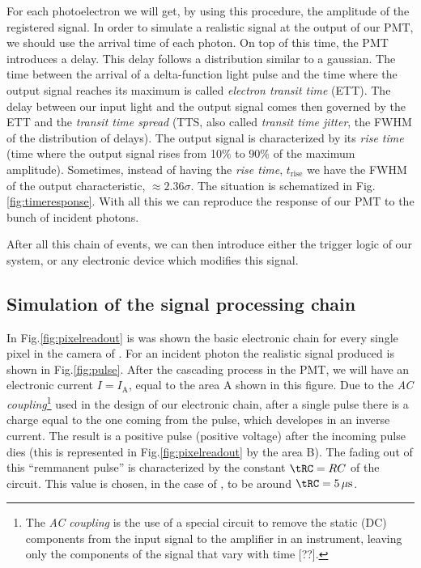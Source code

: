 For each photoelectron we will get, by using this procedure, the
amplitude of the registered signal. In order to simulate a realistic
signal at the output of our PMT, we should use the arrival time of
each photon. On top of this time, the PMT introduces a delay. This
delay follows a distribution similar to a gaussian. The time between
the arrival of a delta-function light pulse and the time where the
output signal reaches its maximum is called \emph{electron transit
  time} (ETT). The delay between our input light and the output signal
comes then governed by the ETT and the \emph{transit time spread}
(TTS, also called \emph{transit time jitter}, the FWHM of the
distribution of delays). The output signal is characterized by its
\emph{rise time} (time where the output signal rises from 10\% to 90\%
of the maximum amplitude). Sometimes, instead of having the \emph{rise
  time}, $t_{\mathrm{rise}}$ we have the FWHM of the output
characteristic, $\approx 2.36\sigma$. The situation is schematized in
Fig. \ref{fig:timeresponse}. With all this we can reproduce the
response of our PMT to the bunch of incident photons.

After all this chain of events, we can then introduce either the
trigger logic of our system, or any electronic device which modifies
this signal.

\subsection{Simulation of the signal processing chain}

In Fig.\ref{fig:pixelreadout} is was shown the basic electronic chain
for every single pixel in the camera of \MAGIC. For an incident photon
the realistic signal produced is shown in Fig.\ref{fig:pulse}. After
the cascading process in the PMT, we will have an electronic current
$I=I_{\mathrm{A}}$, equal to the area A shown in this figure. Due to
the \emph{AC coupling}\footnote{The \emph{AC coupling} is the use of a
  special circuit to remove the static (DC) components from the input
  signal to the amplifier in an instrument, leaving only the
  components of the signal that vary with time [??].}
used in the design of our electronic chain, after a single pulse there
is a charge equal to the one coming from the pulse, which developes in
an inverse current. The result is a positive pulse (positive voltage)
after the incoming pulse dies (this is represented in
Fig.\ref{fig:pixelreadout} by the area B). The fading out of this
``remmanent pulse'' is characterized by the constant $\tRC=RC$ of the
circuit. This value is chosen, in the case of \MAGIC, to be around
$\tRC=5\,\mu\mathrm{s}$.

